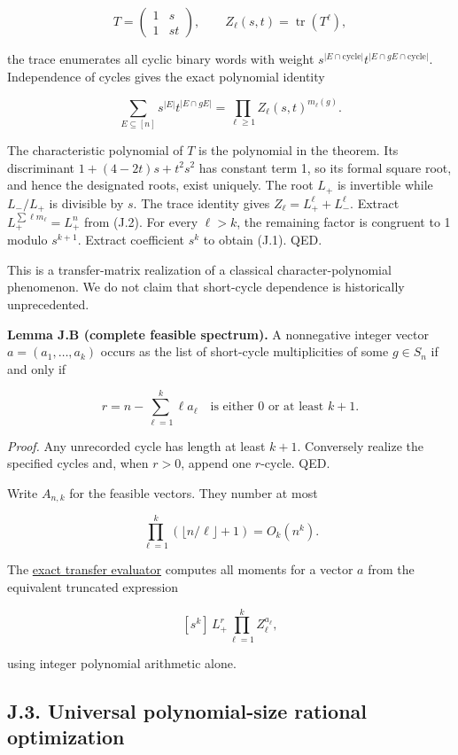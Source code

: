 \documentclass[
  11pt,
]{article}
\begin{document}
\[
T=\begin{pmatrix}1&s\\1&st\end{pmatrix},
\qquad Z_\ell(s,t)=\operatorname{tr}(T^\ell),
\]

the trace enumerates all cyclic binary words with weight
\(s^{|E\cap\text{cycle}|}t^{|E\cap gE\cap\text{cycle}|}\). Independence
of cycles gives the exact polynomial identity

\[
\sum_{E\subseteq[n]}s^{|E|}t^{|E\cap gE|}
=\prod_{\ell\ge1}Z_\ell(s,t)^{m_\ell(g)}. \tag{J.2}
\]

The characteristic polynomial of \(T\) is the polynomial in the theorem.
Its discriminant \(1+(4-2t)s+t^2s^2\) has constant term 1, so its formal
square root, and hence the designated roots, exist uniquely. The root
\(L_+\) is invertible while \(L_-/L_+\) is divisible by \(s\). The trace
identity gives \(Z_\ell=L_+^\ell+L_-^\ell\). Extract
\(L_+^{\sum\ell m_\ell}=L_+^n\) from (J.2). For every \(\ell>k\), the
remaining factor is congruent to 1 modulo \(s^{k+1}\). Extract
coefficient \(s^k\) to obtain (J.1). QED.

This is a transfer-matrix realization of a classical
character-polynomial phenomenon. We do not claim that short-cycle
dependence is historically unprecedented.

\textbf{Lemma J.B (complete feasible spectrum).} A nonnegative integer
vector \(a=(a_1,\ldots,a_k)\) occurs as the list of short-cycle
multiplicities of some \(g\in S_n\) if and only if

\[
r=n-\sum_{\ell=1}^k\ell a_\ell
\quad\text{is either }0\text{ or at least }k+1. \tag{J.3}
\]

\emph{Proof.} Any unrecorded cycle has length at least \(k+1\).
Conversely realize the specified cycles and, when \(r>0\), append one
\(r\)-cycle. QED.

Write \(A_{n,k}\) for the feasible vectors. They number at most

\[
\prod_{\ell=1}^k(\lfloor n/\ell\rfloor+1)=O_k(n^k).
\tag{J.4}
\]

The \href{../../notes/johnson-short-cycle-spectrum/transfer.py}{exact
transfer evaluator} computes all moments for a vector \(a\) from the
equivalent truncated expression

\[
[s^k]\,L_+^r\prod_{\ell=1}^kZ_\ell^{a_\ell}, \tag{J.5}
\]

using integer polynomial arithmetic alone.

\subsection{J.3. Universal polynomial-size rational
optimization}\label{j.3.-universal-polynomial-size-rational-optimization}
\end{document}
